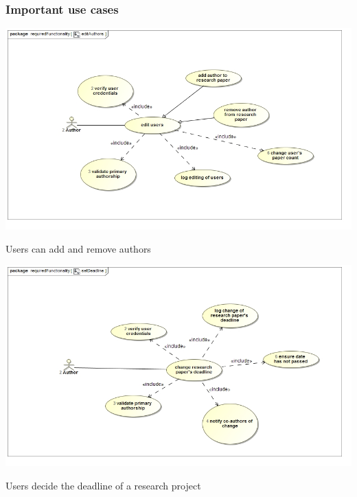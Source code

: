 \documentclass[a4paper,12pt]{report}
\begin{document}
\newpage
\subsubsection{Important use cases}

\begin{flushleft}
	\includegraphics[scale=0.5]{./images/uc__editAuthors.jpg}
	\begin{center}
		Users can add and remove authors
	\end{center}

	\includegraphics[scale=0.5]{./images/uc__setDeadline.jpg}
	\begin{center}
		Users decide the deadline of a research project
	\end{center}
\end{flushleft}

\newpage
\end{document}
